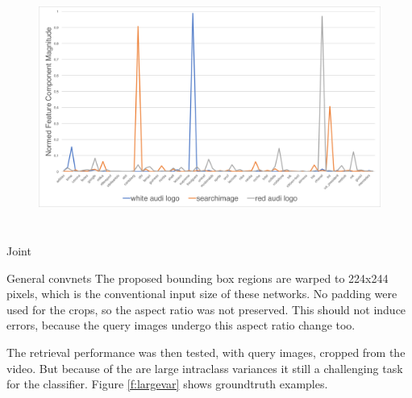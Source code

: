 \begin{figure}
  \centering
  \includegraphics[height=80mm]{images/mt/faster_confusion.png}
  \caption{}
  \label{f:confusion}
\end{figure}

Joint 


General convnets
The proposed bounding box regions are warped to 224x244 pixels, which is the conventional input size of these networks. No padding were used for the crops, so the aspect ratio was not preserved. This should not induce errors, because the query images undergo this aspect ratio change too.

The retrieval performance was then tested, with query images, cropped from the video. But because of the are large intraclass variances it still a challenging task for the classifier. Figure \ref{f:largevar} shows groundtruth examples.

